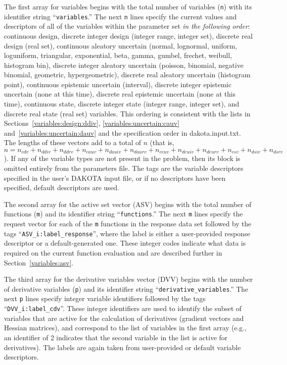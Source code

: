 The first array for variables begins with the total number of
variables (\texttt{n}) with its identifier string
``\texttt{variables}.''  The next \texttt{n} lines specify the current
values and descriptors of all of the variables within the parameter
set \emph{in the following order}: continuous design, discrete integer
design (integer range, integer set), discrete real design (real set),
continuous aleatory uncertain (normal, lognormal, uniform, loguniform,
triangular, exponential, beta, gamma, gumbel, frechet, weibull,
histogram bin), discrete integer aleatory uncertain (poisson,
binomial, negative binomial, geometric, hypergeometric), discrete real
aleatory uncertain (histogram point), continuous epistemic uncertain
(interval), discrete integer epistemic uncertain (none at this time),
discrete real epistemic uncertain (none at this time), continuous
state, discrete integer state (integer range, integer set), and
discrete real state (real set) variables. This ordering is consistent
with the lists in
Sections~\ref{variables:design:ddiv}, \ref{variables:uncertain:cauv}
and~\ref{variables:uncertain:dauv}
and the specification order in dakota.input.txt.  The lengths of these
vectors add to a total of $n$ (that is, $n = n_{cdv} + n_{ddiv} +
n_{ddrv} + n_{cauv} + n_{dauiv} + n_{daurv} + n_{ceuv} + n_{deuiv} +
n_{deurv} + n_{csv} + n_{dsiv} + n_{dsrv}$).  If any of the variable
types are not present in the problem, then its block is omitted
entirely from the parameters file.  The tags are the variable
descriptors specified in the user's DAKOTA input file, or if no
descriptors have been specified, default descriptors are used.

The second array for the active set vector (ASV) begins with the total
number of functions (\texttt{m}) and its identifier string
``\texttt{functions}.'' The next \texttt{m} lines specify the request
vector for each of the \texttt{m} functions in the response data set
followed by the tags ``\texttt{ASV\_i:label\_response}'', where the
label is either a user-provided response descriptor or a
default-generated one. These integer codes indicate what data is
required on the current function evaluation and are described further
in Section~\ref{variables:asv}.

The third array for the derivative variables vector (DVV) begins with
the number of derivative variables (\texttt{p}) and its identifier
string ``\texttt{derivative\_variables}.'' The next \texttt{p} lines
specify integer variable identifiers followed by the tags
``\texttt{DVV\_i:label\_cdv}''.  These integer identifiers are used to
identify the subset of variables that are active for the calculation
of derivatives (gradient vectors and Hessian matrices), and correspond
to the list of variables in the first array (e.g., an identifier of 2
indicates that the second variable in the list is active for
derivatives).  The labels are again taken from user-provided or
default variable descriptors.

